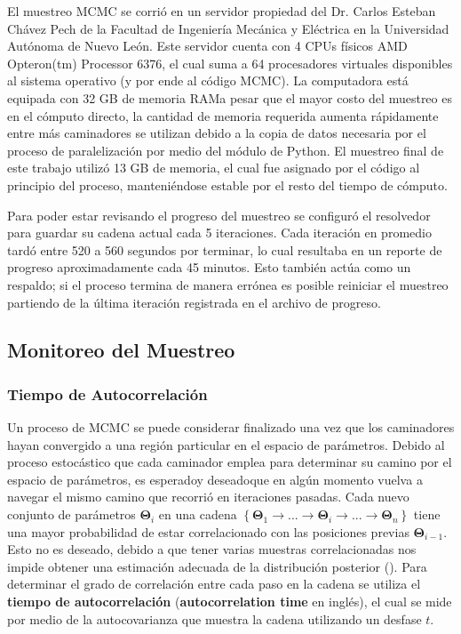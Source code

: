 El muestreo MCMC se corrió en un servidor propiedad del Dr. Carlos Esteban
Chávez Pech de la Facultad de Ingeniería Mecánica y Eléctrica en la Universidad
Autónoma de Nuevo León. Este servidor cuenta con 4 CPUs físicos AMD Opteron(tm)
Processor 6376, el cual suma a 64 procesadores virtuales disponibles al sistema
operativo (y por ende al código MCMC). La computadora está equipada con 32 GB de
memoria RAM\textemdash a pesar que el mayor costo del muestreo es en el cómputo
directo, la cantidad de memoria requerida aumenta rápidamente entre más
caminadores se utilizan debido a la copia de datos necesaria por el proceso de
paralelización por medio del módulo  de Python. El
muestreo final de este trabajo utilizó 13 GB de memoria, el cual fue asignado
por el código al principio del proceso, manteniéndose estable por el resto del
tiempo de cómputo.

Para poder estar revisando el progreso del muestreo se configuró el resolvedor
para guardar su cadena actual cada 5 iteraciones. Cada iteración en
promedio tardó entre 520 a 560 segundos por terminar, lo cual resultaba en un
reporte de progreso aproximadamente cada 45 minutos. Esto también actúa como
un respaldo; si el proceso termina de manera errónea es posible reiniciar el
muestreo partiendo de la última iteración registrada en el archivo de progreso. 

\subsection{Monitoreo del Muestreo}

\subsubsection{Tiempo de Autocorrelación}

Un proceso de MCMC se puede considerar finalizado una vez que los caminadores
hayan convergido a una región particular en el espacio de parámetros. Debido al
proceso estocástico que cada caminador emplea para determinar su camino por el
espacio de parámetros, es esperado\textemdash y deseado\textemdash que en algún
momento vuelva a navegar el mismo camino que recorrió en iteraciones pasadas.
Cada nuevo conjunto de parámetros $\mathbf{\Theta}_i$ en una cadena
$\left\{\mathbf{\Theta}_1 \rightarrow ... \rightarrow \mathbf{\Theta}_i
\rightarrow ... \rightarrow \mathbf{\Theta}_n \right\}$ tiene una mayor
probabilidad de estar correlacionado con las posiciones previas
$\mathbf{\Theta}_{i - 1}$. Esto no es deseado, debido a que tener varias
muestras correlacionadas nos impide obtener una estimación adecuada de la
distribución posterior ().
Para determinar el grado de correlación entre cada paso en la cadena se utiliza
el \textbf{tiempo de autocorrelación} (\textbf{autocorrelation time} en inglés),
el cual se mide por medio de la autocovarianza que muestra la cadena utilizando
un desfase $t$.

